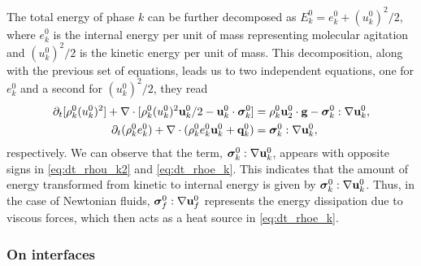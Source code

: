 The total energy of phase $k$ can be further decomposed as $E_k^0 = e_k^0 + (u_k^0)^2/2$, where $e_k^0$ is the internal energy per unit of mass representing molecular agitation and $(u_k^0)^2/2$ is the kinetic energy per unit of mass.
This decomposition, along with the previous set of equations, leads us to two independent equations, one for $e_k^0$ and a second for $(u_k^0)^2/2$, they read
\begin{align}
    \label{eq:dt_rhou_k2}
    \partial_t [\rho_k^0(u_k^0)^2]  
    + \mathbf{\nabla}\cdot [\rho_k^0(u_k^0)^2\textbf{u}_k^0/2 - \textbf{u}_k^0 \cdot \bm{\sigma}_k^0]
    &=
    \rho_k^0\textbf{u}_2^0 \cdot \textbf{g}  
    -  \bm{\sigma}_k^0 : \mathbf{\nabla} \textbf{u}_k^0,
    \\
    \label{eq:dt_rhoe_k}
    \partial_t (\rho_k^0e_k^0)  
    + \mathbf{\nabla}\cdot (
        \rho_k^0e_k^0\textbf{u}_k^0
        + \textbf{q}_k^0
        )
    &= 
    \bm{\sigma}_k^0 : \mathbf{\nabla} \textbf{u}_k^0,
\end{align} 
respectively. 
We can observe that the term, $\bm{\sigma}_k^0 : \mathbf{\nabla} \textbf{u}_k^0$,  appears with opposite signs in \ref{eq:dt_rhou_k2} and \ref{eq:dt_rhoe_k}.
This indicates that the amount of energy transformed from kinetic to internal energy is given by $\bm{\sigma}_k^0 : \mathbf{\nabla} \textbf{u}_k^0$.
Thus, in the case of Newtonian fluids, $\bm{\sigma}_f^0 : \mathbf{\nabla} \textbf{u}_f^0$ represents the energy dissipation due to viscous forces, which then acts as a heat source in \ref{eq:dt_rhoe_k}. 

\subsubsection{On interfaces}

